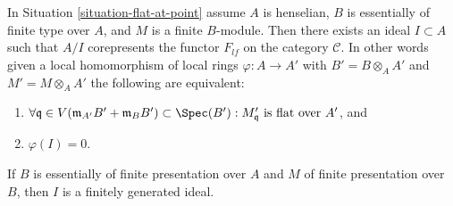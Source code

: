 %
\begin{theorem}
\label{theorem-flattening-local}
In
Situation \ref{situation-flat-at-point}
assume $A$ is henselian, $B$ is essentially of finite type over $A$, and
$M$ is a finite $B$-module. Then there exists an ideal
$I \subset A$ such that $A/I$ corepresents the functor $F_{lf}$ on the category
$\mathcal{C}$. In other words given a local homomorphism of local rings
$\varphi : A \to A'$ with $B' = B \otimes_A A'$ and $M' = M \otimes_A A'$
the following are equivalent:
\begin{enumerate}
\item $\forall \mathfrak q \in V(\mathfrak m_{A'}B' + \mathfrak m_B B')
\subset \Spec(B') :
M'_{\mathfrak q}\text{ is flat over }A'$, and
\item $\varphi(I) = 0$.
\end{enumerate}
If $B$ is essentially of finite presentation over $A$ and $M$
of finite presentation over $B$, then $I$ is a finitely generated ideal.
\end{theorem}

